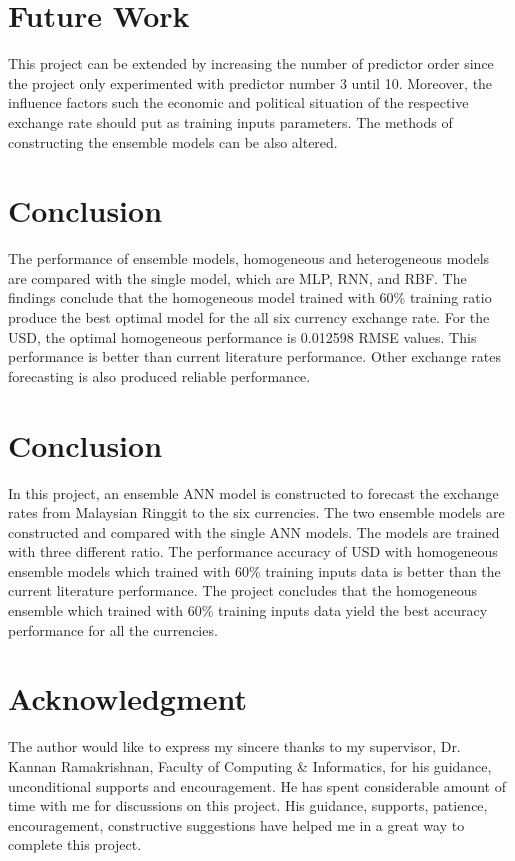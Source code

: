 \documentclass[journal]{IEEEtran}
\begin{document}
\section{Future Work}

This project can be extended by increasing the number of predictor order since the project only experimented with predictor number 3 until 10. Moreover, the influence factors such the economic and political situation of the respective exchange rate should put as training inputs parameters. The methods of constructing the ensemble models can be also altered. 


\section{Conclusion}


The performance of ensemble models, homogeneous and heterogeneous models are compared with the single model, which are MLP, RNN, and RBF. The findings conclude that the homogeneous model trained with 60\% training ratio produce the best optimal model for the all six currency exchange rate. For the USD, the optimal homogeneous  performance is 0.012598 RMSE values. This performance is better than current literature performance. Other exchange rates forecasting is also produced reliable performance.

\section{Conclusion}
In this project, an ensemble ANN model is constructed to forecast the exchange rates from Malaysian Ringgit to the six currencies. The two ensemble models are constructed and compared with the single ANN models. The models are trained with three different ratio.  The performance accuracy of USD with homogeneous ensemble models which trained with 60\% training inputs data is better than the current literature performance. The project concludes that the homogeneous ensemble which trained with 60\% training inputs data yield the best accuracy performance for all the currencies. 


\section*{Acknowledgment}


The author would like to express my sincere thanks to my supervisor, Dr. Kannan Ramakrishnan, Faculty of Computing \& Informatics, for his guidance, unconditional supports and encouragement. He has spent considerable amount of time with me for discussions on this project. His guidance, supports, patience, encouragement, constructive suggestions have helped me in a great way to complete this project. 
\end{document}
